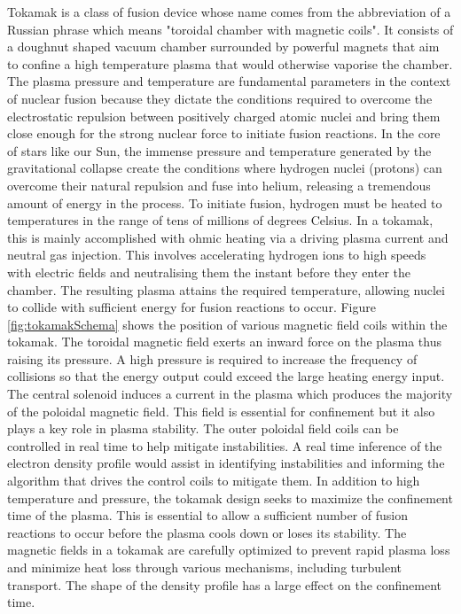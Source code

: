 Tokamak is a class of fusion device whose name comes from the abbreviation of a Russian phrase which means "toroidal chamber with magnetic coils". It consists of a doughnut shaped vacuum chamber surrounded by powerful magnets that aim to confine a high temperature plasma that would otherwise vaporise the chamber. The plasma pressure and temperature are fundamental parameters in the context of nuclear fusion because they dictate the conditions required to overcome the electrostatic repulsion between positively charged atomic nuclei and bring them close enough for the strong nuclear force to initiate fusion reactions. In the core of stars like our Sun, the immense pressure and temperature generated by the gravitational collapse create the conditions where hydrogen nuclei (protons) can overcome their natural repulsion and fuse into helium, releasing a tremendous amount of energy in the process. To initiate fusion, hydrogen must be heated to temperatures in the range of tens of millions of degrees Celsius. In a tokamak, this is mainly accomplished with ohmic heating via a driving plasma current and neutral gas injection. This involves accelerating hydrogen ions to high speeds with electric fields and neutralising them the instant before they enter the chamber. The resulting plasma attains the required temperature, allowing nuclei to collide with sufficient energy for fusion reactions to occur. Figure \ref{fig:tokamakSchema} shows the position of various magnetic field coils within the tokamak. The toroidal magnetic field exerts an inward force on the plasma thus raising its pressure. A high pressure is required to increase the frequency of collisions so that the energy output could exceed the large heating energy input. The central solenoid induces a current in the plasma which produces the majority of the poloidal magnetic field. This field is essential for confinement but it also plays a key role in plasma stability. The outer poloidal field coils can be controlled in real time to help mitigate instabilities. A real time inference of the electron density profile would assist in identifying instabilities and informing the algorithm that drives the control coils to mitigate them. In addition to high temperature and pressure, the tokamak design seeks to maximize the confinement time of the plasma. This is essential to allow a sufficient number of fusion reactions to occur before the plasma cools down or loses its stability. The magnetic fields in a tokamak are carefully optimized to prevent rapid plasma loss and minimize heat loss through various mechanisms, including turbulent transport. The shape of the density profile has a large effect on the confinement time.

